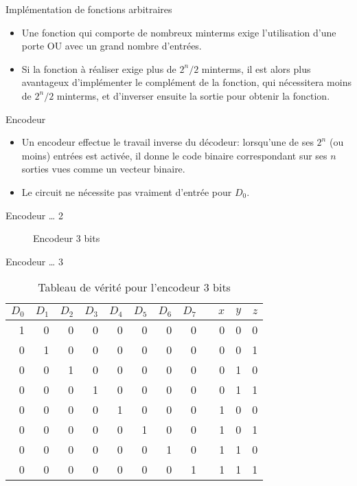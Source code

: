 \documentclass[presentation]{beamer}
\begin{document}
\begin{frame}[label={sec:orgc38ee96}]{Implémentation de fonctions arbitraires}
\begin{itemize}
\item Une fonction qui comporte de nombreux minterms exige l'utilisation d'une porte OU avec un grand nombre d'entrées.

\item Si la fonction à réaliser exige plus de \(2^n/2\) minterms, il est alors plus avantageux d'implémenter le complément de la fonction, qui nécessitera moins de \(2^n/2\) minterms, et d'inverser ensuite la sortie pour obtenir la fonction.
\end{itemize}
\end{frame}

\begin{frame}[label={sec:org5349f38}]{Encodeur}
\begin{itemize}
\item Un encodeur effectue le travail inverse du décodeur: lorsqu'une de ses \(2^n\) (ou moins) entrées est activée, il donne le code binaire correspondant sur ses \(n\) sorties vues comme un vecteur binaire.

\item Le circuit ne nécessite pas vraiment d'entrée pour \(D_0\).
\end{itemize}
\end{frame}

\begin{frame}[label={sec:orge928ef0}]{Encodeur \ldots{} 2}
\begin{figure}[htbp]
\centering

\caption{\label{fig:orgc4d368b}Encodeur 3 bits}
\end{figure}
\end{frame}

\begin{frame}[label={sec:orgba8fdda}]{Encodeur \ldots{} 3}
\begin{table}[htbp]
\caption{\label{tab:org8ded1e5}Tableau de vérité pour l'encodeur 3 bits}
\centering
\begin{tabular}{rrrrrrrrlrrr}
\(D_0\) & \(D_1\) & \(D_2\) & \(D_3\) & \(D_4\) & \(D_5\) & \(D_6\) & \(D_7\) &  & \(x\) & \(y\) & \(z\)\\[0pt]
\hline
1 & 0 & 0 & 0 & 0 & 0 & 0 & 0 &  & 0 & 0 & 0\\[0pt]
0 & 1 & 0 & 0 & 0 & 0 & 0 & 0 &  & 0 & 0 & 1\\[0pt]
0 & 0 & 1 & 0 & 0 & 0 & 0 & 0 &  & 0 & 1 & 0\\[0pt]
0 & 0 & 0 & 1 & 0 & 0 & 0 & 0 &  & 0 & 1 & 1\\[0pt]
0 & 0 & 0 & 0 & 1 & 0 & 0 & 0 &  & 1 & 0 & 0\\[0pt]
0 & 0 & 0 & 0 & 0 & 1 & 0 & 0 &  & 1 & 0 & 1\\[0pt]
0 & 0 & 0 & 0 & 0 & 0 & 1 & 0 &  & 1 & 1 & 0\\[0pt]
0 & 0 & 0 & 0 & 0 & 0 & 0 & 1 &  & 1 & 1 & 1\\[0pt]
\end{tabular}
\end{table}
\end{frame}
\end{document}
